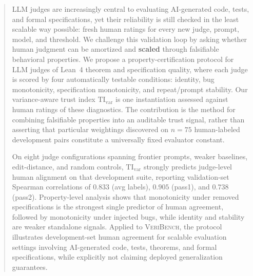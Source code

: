 \documentclass{article}
\begin{document}

\printAffiliationsAndNotice{}

\begin{abstract}
  LLM judges are increasingly central to evaluating AI-generated code, tests, and formal specifications, yet their reliability is still checked in the least scalable way possible: fresh human ratings for every new judge, prompt, model, and threshold. We challenge this validation loop by asking whether human judgment can be amortized and \textbf{scaled} through falsifiable behavioral properties. We propose a property-certification protocol for LLM judges of Lean~4 theorem and specification quality, where each judge is scored by four automatically testable conditions: identity, bug monotonicity, specification monotonicity, and repeat/prompt stability. Our variance-aware trust index \(\mathrm{TI}_{\mathrm{var}}\) is one instantiation assessed against human ratings of these diagnostics. The contribution is the method for combining falsifiable properties into an auditable trust signal, rather than asserting that particular weightings discovered on \(n {=} 75\) human-labeled development pairs constitute a universally fixed evaluator constant.

  On eight judge configurations spanning frontier prompts, weaker baselines, edit-distance, and random controls, \(\mathrm{TI}_{\mathrm{var}}\) strongly predicts judge-level human alignment on that development suite, reporting validation-set Spearman correlations of \(0.833\) (avg labels), \(0.905\) (pass1), and \(0.738\) (pass2). Property-level analysis shows that monotonicity under removed specifications is the strongest single predictor of human agreement, followed by monotonicity under injected bugs, while identity and stability are weaker standalone signals. Applied to \textsc{VeriBench}, the protocol illustrates development-set human agreement for scalable evaluation settings involving AI-generated code, tests, theorems, and formal specifications, while explicitly not claiming deployed generalization guarantees.
\end{abstract}
\end{document}
